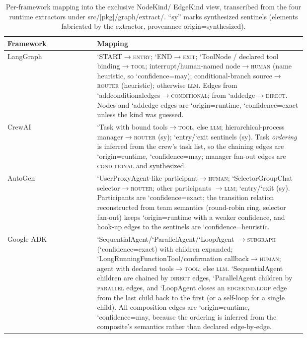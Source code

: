 \documentclass[11pt]{article}
\DeclareRobustCommand{\bslash}{\char`\_\allowbreak}
\DeclareRobustCommand{\artifact}[1]{{\small\ttfamily\let\_\bslash #1}}
\DeclareRobustCommand{\slug}[1]{{\ttfamily\let\_\bslash #1}}
\begin{document}
\begin{table}[htbp]
\centering\small
\caption{Per-framework mapping into the exclusive \slug{NodeKind}/%
\slug{EdgeKind} view, transcribed from the four runtime extractors under
\artifact{src/[pkg]/graph/extract/}. ``sy'' marks synthesized sentinels
(elements fabricated by the extractor, provenance
\slug{origin=synthesized}).}
\label{tab:fwmap}
\begin{tabular}{@{}lp{0.70\linewidth}@{}}
\toprule
\textbf{Framework} & \textbf{Mapping} \\
\midrule
LangGraph
& \slug{START}$\to$\textsc{entry}; \slug{END}$\to$\textsc{exit};
  \slug{ToolNode} / declared tool binding$\to$\textsc{tool};
  interrupt/human-named node$\to$\textsc{human} (name heuristic, so
  \slug{confidence=may}); conditional-branch source$\to$\textsc{router}
  (heuristic); otherwise \textsc{llm}. Edges from
  \slug{add\_conditional\_edges}$\to$\textsc{conditional}; from
  \slug{add\_edge}$\to$\textsc{direct}. Nodes and \slug{add\_edge} edges are
  \slug{origin=runtime}, \slug{confidence=exact} unless the kind was guessed.
  \\[3pt]
CrewAI
& \slug{Task} with bound tools$\to$\textsc{tool}, else \textsc{llm};
  hierarchical-process manager$\to$\textsc{router} (sy);
  \slug{\_\_entry\_\_}/\slug{\_\_exit\_\_} sentinels (sy). Task \emph{ordering}
  is inferred from the crew's task list, so the chaining edges are
  \slug{origin=runtime}, \slug{confidence=may}; manager fan-out edges are
  \textsc{conditional} and synthesized. \\[3pt]
AutoGen
& \slug{UserProxyAgent}-like participant$\to$\textsc{human};
  \slug{SelectorGroupChat} selector$\to$\textsc{router}; other participants
  $\to$\textsc{llm}; \slug{\_\_entry\_\_}/\slug{\_\_exit\_\_} (sy).
  Participants are \slug{confidence=exact}; the transition relation
  reconstructed from team semantics (round-robin ring, selector fan-out) keeps
  \slug{origin=runtime} with a weaker confidence, and hook-up edges to the
  sentinels are \slug{confidence=heuristic}. \\[3pt]
Google ADK
& \slug{SequentialAgent}/\slug{ParallelAgent}/\slug{LoopAgent}
  $\to$\textsc{subgraph} (\slug{confidence=exact}) with children expanded;
  \slug{LongRunningFunctionTool}/confirmation callback$\to$\textsc{human};
  agent with declared tools$\to$\textsc{tool}; else \textsc{llm}.
  \slug{SequentialAgent} children are chained by \textsc{direct} edges,
  \slug{ParallelAgent} children by \textsc{parallel} edges, and
  \slug{LoopAgent} closes an \textsc{edgekind.loop} edge from the last child
  back to the first (or a self-loop for a single child). All composition edges
  are \slug{origin=runtime}, \slug{confidence=may}, because the ordering is
  inferred from the composite's semantics rather than declared edge-by-edge. \\
\bottomrule
\end{tabular}
\end{table}
\end{document}

